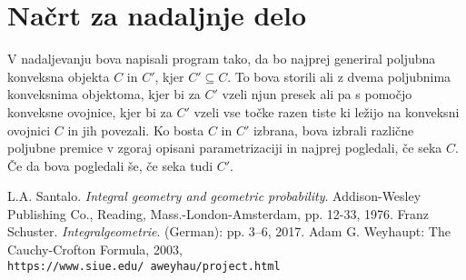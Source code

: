 \documentclass[a4paper,12pt]{article}
\begin{document}
\section{Načrt za nadaljnje delo}
V nadaljevanju bova napisali program tako, da bo najprej generiral poljubna konveksna objekta $C$ in $C'$, kjer $C' \subseteq C$. To bova storili ali z dvema poljubnima konveksnima objektoma, kjer bi za $C'$ vzeli njun presek ali pa s pomočjo konveksne ovojnice, kjer bi za $C'$ vzeli vse točke razen tiste ki ležijo na konveksni ovojnici $C$ in jih povezali. 
Ko bosta $C$ in $C'$ izbrana, bova izbrali različne poljubne premice v zgoraj opisani parametrizaciji in najprej pogledali, če seka $C$. Če da bova pogledali še, če seka tudi $C'$.
\begin{thebibliography}{9}
 L.A. Santalo. \textit{Integral geometry and geometric probability}. Addison-Wesley Publishing Co., Reading, Mass.-London-Amsterdam, pp. 12-33, 1976.
 Franz Schuster. \textit{Integralgeometrie}. (German): pp. 3–6, 2017.
 Adam G. Weyhaupt: The Cauchy-Crofton Formula, 2003,\\\texttt{https://www.siue.edu/~aweyhau/project.html}
\end{thebibliography}
\end{document}
